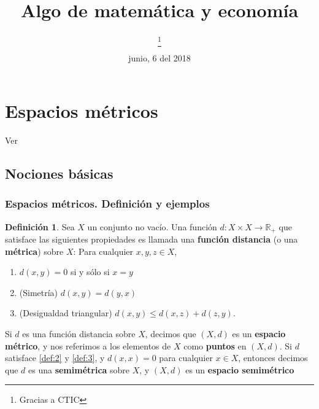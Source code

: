\documentclass[10pt,a4paper]{article}
\title{\Huge\bfseries Algo de matemática y economía}
\author{\color{red}{Juan Pérez}\thanks{Gracias a CTIC}}
\date{junio, 6 del 2018}
\theoremstyle{definition}
\newtheorem{definition}{Definición}
\begin{document}
\maketitle
\tableofcontents
\listoffigures
\listoftables
\thispagestyle{empty}

\section{Espacios métricos}

Ver \cite[Capítulo C]{Ok2007}

\subsection{Nociones básicas}

\subsubsection{Espacios métricos. Definición y ejemplos}

\begin{definition}

Sea $X$ un conjunto no vacío. Una función $d:X\times X\rightarrow\mathbb{R}_{+}$ que satisface las siguientes propiedades es llamada una \textbf{función distancia} (o una \textbf{métrica}) sobre $X$: Para cualquier $x,y,z\in X$,

\begin{enumerate}[label=\arabic*.]

	\item $d(x,y)=0$ si y sólo si $x=y$ \label{def:1}
	
	\item (Simetría) $d(x,y)=d(y,x)$ \label{def:2}
	
	\item (Desigualdad triangular) $d(x,y)\leq d(x,z)+d(z,y)$. \label{def:3}

\end{enumerate}

\end{definition}

Si $d$ es una función distancia sobre $X$, decimos que $(X,d)$ es un \textbf{espacio métrico}, y nos referimos a los elementos \linebreak de $X$ como \textbf{puntos} en $(X,d)$. Si $d$ satisface \ref{def:2} y \ref{def:3}, y $d(x,x)=0$ para cualquier $x\in X$, entonces decimos que $d$ \linebreak es una \textbf{semimétrica} sobre $X$, y $(X,d)$ es un \textbf{espacio semimétrico}
\end{document}
